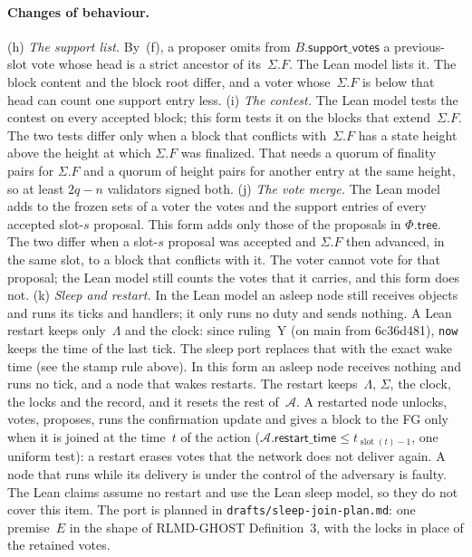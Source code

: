 \documentclass{article}
\newcommand{\slot}{\operatorname{slot}}
\newcommand{\AC}{\mathcal A}
\newcommand{\Fr}{\Phi}
\newcommand{\tree}{\mathsf{tree}}
\newcommand{\restartTime}{\mathsf{restart\_time}}
\begin{document}
\paragraph{Changes of behaviour.}
(h) \emph{The support list.}  By~(f), a proposer omits from
$B.\mathsf{support\_votes}$ a previous-slot vote whose head is a strict
ancestor of its~$\Sigma.F$.  The Lean model lists it.  The block content
and the block root differ, and a voter whose~$\Sigma.F$ is below that
head can count one support entry less.
(i) \emph{The contest.}  The Lean model tests the contest on every
accepted block; this form tests it on the blocks that
extend~$\Sigma.F$.  The two tests differ only when a block that conflicts
with~$\Sigma.F$ has a state height above the height at which $\Sigma.F$
was finalized.  That needs a quorum of finality pairs for $\Sigma.F$ and
a quorum of height pairs for another entry at the same height, so at
least $2q-n$ validators signed both.
(j) \emph{The vote merge.}  The Lean model adds to the frozen sets of a
voter the votes and the support entries of every accepted slot-$s$
proposal.  This form adds only those of the proposals in $\Fr.\tree$.
The two differ when a slot-$s$ proposal was accepted and $\Sigma.F$ then
advanced, in the same slot, to a block that conflicts with it.  The voter
cannot vote for that proposal; the Lean model still counts the votes that
it carries, and this form does not.
(k) \emph{Sleep and restart.}  In the Lean model an asleep node still
receives objects and runs its ticks and handlers; it only runs no duty
and sends nothing.  A Lean restart keeps only~$\Lambda$ and the clock: since
ruling~Y (on main from 6c36d481), \texttt{now} keeps the time of the last
tick.  The sleep port replaces that with the exact wake time (see the stamp
rule above).  In this form an asleep node receives nothing and runs no tick, and
a node that wakes restarts.  The restart keeps~$\Lambda$, $\Sigma$, the
clock, the locks and the record, and it resets the rest of~$\AC$.  A
restarted node unlocks, votes, proposes, runs the confirmation update and
gives a block to the FG only when it is joined at the time~$t$ of the
action ($\AC.\restartTime\leq t_{\slot(t)-1}$, one uniform test): a
restart erases votes that the network does not deliver again.  A node
that runs while its delivery is under the control of the adversary is
faulty.  The
Lean claims assume no restart and use the Lean sleep model, so they do not
cover this item.  The
port is planned in \texttt{drafts/sleep-join-plan.md}: one premise~$E$ in
the shape of RLMD-GHOST Definition~3, with the locks in place of the
retained votes.
\end{document}
